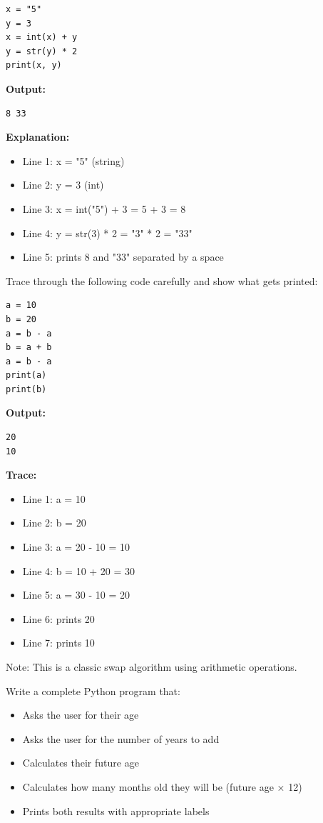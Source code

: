 \documentclass{csexam}
\begin{document}
\begin{questions}
\begin{lstlisting}
x = "5"
y = 3
x = int(x) + y
y = str(y) * 2
print(x, y)
\end{lstlisting}

\begin{solution}
\textbf{Output:}
\begin{verbatim}
8 33
\end{verbatim}

\textbf{Explanation:}
\begin{itemize}
    \item Line 1: x = "5" (string)
    \item Line 2: y = 3 (int)
    \item Line 3: x = int("5") + 3 = 5 + 3 = 8
    \item Line 4: y = str(3) * 2 = "3" * 2 = "33"
    \item Line 5: prints 8 and "33" separated by a space
\end{itemize}
\end{solution}

\question[8] Trace through the following code carefully and show what gets printed:
\begin{lstlisting}
a = 10
b = 20
a = b - a
b = a + b
a = b - a
print(a)
print(b)
\end{lstlisting}

\begin{solution}
\textbf{Output:}
\begin{verbatim}
20
10
\end{verbatim}

\textbf{Trace:}
\begin{itemize}
    \item Line 1: a = 10
    \item Line 2: b = 20
    \item Line 3: a = 20 - 10 = 10
    \item Line 4: b = 10 + 20 = 30
    \item Line 5: a = 30 - 10 = 20
    \item Line 6: prints 20
    \item Line 7: prints 10
\end{itemize}

Note: This is a classic swap algorithm using arithmetic operations.
\end{solution}

\newpage

\question[14] Write a complete Python program that:
\begin{itemize}
    \item Asks the user for their age
    \item Asks the user for the number of years to add
    \item Calculates their future age
    \item Calculates how many months old they will be (future age × 12)
    \item Prints both results with appropriate labels
\end{itemize}


\end{questions}
\end{document}
